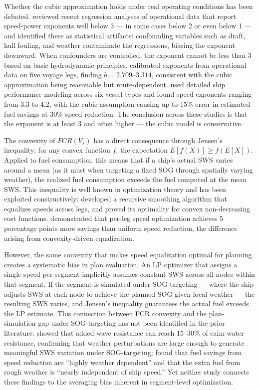 \documentclass[review,authoryear]{elsarticle}  %
\begin{document}
Whether the cubic approximation holds under real operating conditions has been debated. \citet{Psaraftis2023} reviewed recent regression analyses of operational data that report speed-power exponents well below 3 --- in some cases below 2 or even below 1 --- and identified these as statistical artifacts: confounding variables such as draft, hull fouling, and weather contaminate the regressions, biasing the exponent downward. When confounders are controlled, the exponent cannot be less than 3 based on basic hydrodynamic principles. \citet{Wang2012} calibrated exponents from operational data on five voyage legs, finding $b = 2.709$--$3.314$, consistent with the cubic approximation being reasonable but route-dependent. \citet{Taskar2020} used detailed ship performance modeling across six vessel types and found speed exponents ranging from 3.3 to 4.2, with the cubic assumption causing up to 15\% error in estimated fuel savings at 30\% speed reduction. The conclusion across these studies is that the exponent is at least 3 and often higher --- the cubic model is conservative.

The convexity of $FCR(V_s)$ has a direct consequence through Jensen's inequality: for any convex function $f$, the expectation $E[f(X)] \geq f(E[X])$. Applied to fuel consumption, this means that if a ship's actual SWS varies around a mean (as it must when targeting a fixed SOG through spatially varying weather), the realized fuel consumption exceeds the fuel computed at the mean SWS. This inequality is well known in optimization theory and has been exploited constructively: \citet{Norstad2011} developed a recursive smoothing algorithm that equalizes speeds across legs, and \citet{Hvattum2013} proved its optimality for convex non-decreasing cost functions. \citet{Fagerholt2010} demonstrated that per-leg speed optimization achieves 5 percentage points more savings than uniform speed reduction, the difference arising from convexity-driven equalization.

However, the same convexity that makes speed equalization optimal for planning creates a systematic bias in plan evaluation. An LP optimizer that assigns a single speed per segment implicitly assumes constant SWS across all nodes within that segment. If the segment is simulated under SOG-targeting --- where the ship adjusts SWS at each node to achieve the planned SOG given local weather --- the resulting SWS varies, and Jensen's inequality guarantees the actual fuel exceeds the LP estimate. This connection between FCR convexity and the plan-simulation gap under SOG-targeting has not been identified in the prior literature. \citet{Tezdogan2015} showed that added wave resistance can reach 15--30\% of calm-water resistance, confirming that weather perturbations are large enough to generate meaningful SWS variation under SOG-targeting; \citet{Taskar2020} found that fuel savings from speed reduction are ``highly weather dependent'' and that the extra fuel from rough weather is ``nearly independent of ship speed.'' Yet neither study connects these findings to the averaging bias inherent in segment-level optimization.
\end{document}
